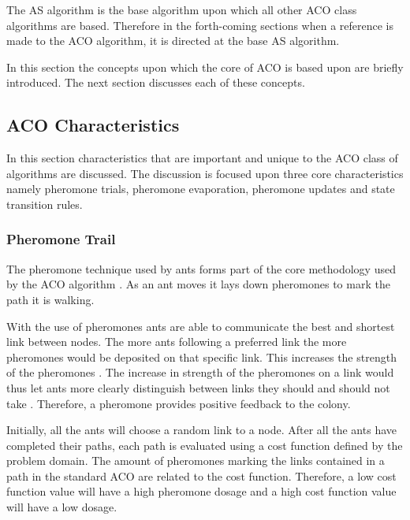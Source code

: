 The \gls{AS} algorithm is the base algorithm upon which all other \gls{ACO} class algorithms are based. Therefore in the forth-coming sections when a reference is made to the \gls{ACO} algorithm, it is directed at the base \gls{AS} algorithm.

In this section the concepts  upon which the core of \gls{ACO} is based upon are briefly introduced. The next section discusses each of these concepts.
\subsection{ACO Characteristics}
\label{sec:ACOcharacter}
In this section characteristics that are important and unique to the \gls{ACO} class of algorithms are discussed. The discussion is focused upon three core characteristics namely pheromone trials, pheromone evaporation, pheromone updates and state transition rules.
\subsubsection{Pheromone Trail}
\label{sec:pheromonetrail}
The pheromone technique used by ants forms part of the core methodology used by the \gls{ACO} algorithm \cite{AntQAP}. As an ant moves it lays down pheromones to mark the path it is walking.

With the use of pheromones ants are able to communicate the best and shortest link between nodes\cite{AntQAP,AntsAndStigmergy,CompuIntelligenceIntro}. The more ants following a preferred link the more pheromones would be deposited on that specific link. This increases the strength of the pheromones \cite{ImpACOComplex}. The increase in strength of the pheromones on a link would thus let ants more clearly distinguish between links they should and should not take \cite{ImpACOComplex}. Therefore, a pheromone provides positive feedback to the colony\cite{AntQAP,AntsAndStigmergy,CompuIntelligenceIntro}.

Initially, all the ants will choose a random link to a node\cite{AntQAP,AntsAndStigmergy,CompuIntelligenceIntro}. After all the ants have completed their paths, each path is evaluated using a cost function defined by the problem domain\cite{CompuIntelligenceIntro}. The amount of pheromones marking the links contained in a path in the standard \gls{ACO} are related to the cost function\cite{AntQAP,AntsAndStigmergy,CompuIntelligenceIntro}. Therefore, a low cost function value will have a high pheromone dosage and a high cost function value will have a low dosage\cite{CompuIntelligenceIntro}. 


